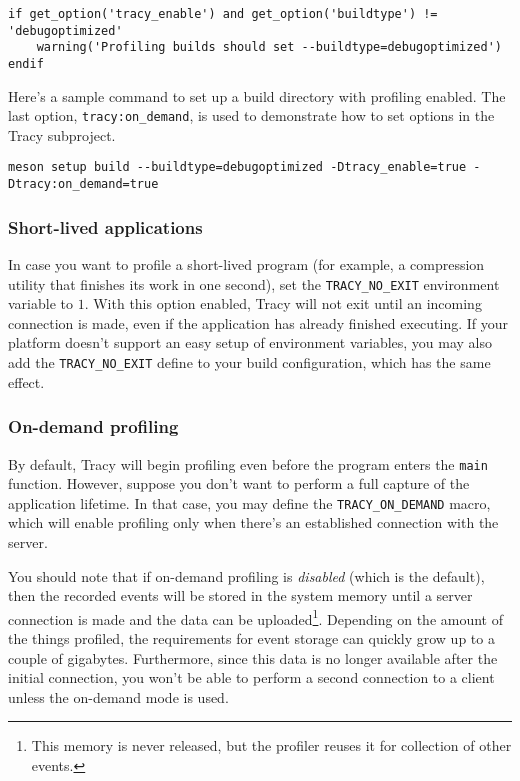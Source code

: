 \documentclass[hidelinks,titlepage,a4paper,twoside]{article}
\begin{document}
\begin{lstlisting}
if get_option('tracy_enable') and get_option('buildtype') != 'debugoptimized'
    warning('Profiling builds should set --buildtype=debugoptimized')
endif
\end{lstlisting}

Here's a sample command to set up a build directory with profiling enabled. The last option, \texttt{tracy:on\_demand}, is used to demonstrate how to set options in the Tracy subproject.

\begin{lstlisting}
meson setup build --buildtype=debugoptimized -Dtracy_enable=true -Dtracy:on_demand=true
\end{lstlisting}

\subsubsection{Short-lived applications}

In case you want to profile a short-lived program (for example, a compression utility that finishes its work in one second), set the \texttt{TRACY\_NO\_EXIT} environment variable to $1$. With this option enabled, Tracy will not exit until an incoming connection is made, even if the application has already finished executing. If your platform doesn't support an easy setup of environment variables, you may also add the \texttt{TRACY\_NO\_EXIT} define to your build configuration, which has the same effect.

\subsubsection{On-demand profiling}
\label{ondemand}

By default, Tracy will begin profiling even before the program enters the \texttt{main} function. However, suppose you don't want to perform a full capture of the application lifetime. In that case, you may define the \texttt{TRACY\_ON\_DEMAND} macro, which will enable profiling only when there's an established connection with the server.

You should note that if on-demand profiling is \emph{disabled} (which is the default), then the recorded events will be stored in the system memory until a server connection is made and the data can be uploaded\footnote{This memory is never released, but the profiler reuses it for collection of other events.}. Depending on the amount of the things profiled, the requirements for event storage can quickly grow up to a couple of gigabytes. Furthermore, since this data is no longer available after the initial connection, you won't be able to perform a second connection to a client unless the on-demand mode is used.
\end{document}
